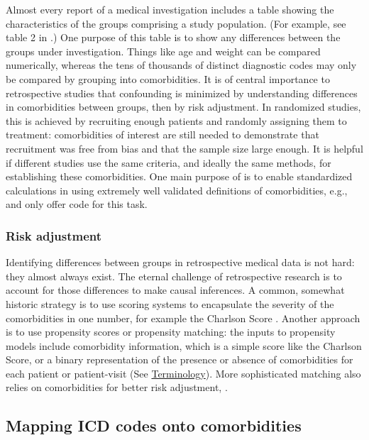 \documentclass[article]{jss}
\begin{document}
Almost every report of a medical investigation includes a table showing
the characteristics of the groups comprising a study population. (For
example, see table 2 in \citet{frank_risk-adjusted_2014}.) One purpose
of this table is to show any differences between the groups under
investigation. Things like age and weight can be compared numerically,
whereas the tens of thousands of distinct diagnostic codes may only be
compared by grouping into comorbidities. It is of central importance to
retrospective studies that confounding is minimized by understanding
differences in comorbidities between groups, then by risk adjustment. In
randomized studies, this is achieved by recruiting enough patients and
randomly assigning them to treatment: comorbidities of interest are
still needed to demonstrate that recruitment was free from bias and that
the sample size large enough. It is helpful if different studies use the
same criteria, and ideally the same methods, for establishing these
comorbidities. One main purpose of  is to enable standardized
calculations in  using extremely well validated definitions
of comorbidities, e.g., \citet{quan_updating_2011} and
\citet{AgencyforHealthcareResearchandQuality_ElixhauserComorbiditySoftware_2018}
only offer  code for this task.

\subsubsection{Risk adjustment}\label{risk-adjustment}

Identifying differences between groups in retrospective medical data is
not hard: they almost always exist. The eternal challenge of
retrospective research is to account for those differences to make
causal inferences. A common, somewhat historic strategy is to use
scoring systems to encapsulate the severity of the comorbidities in one
number, for example the Charlson Score \citep{charlson_new_1987}.
Another approach is to use propensity scores or propensity matching: the
inputs to propensity models include comorbidity information, which is a
simple score like the Charlson Score, or a binary representation of the
presence or absence of comorbidities for each patient or patient-visit
(See \protect\hyperlink{terminology}{Terminology}). More sophisticated
matching also relies on comorbidities for better risk adjustment,
\citep[e.g.,][]{diamond_genetic_2012}.

\subsection{Mapping ICD codes onto
comorbidities}\label{mapping-icd-codes-onto-comorbidities}
\end{document}
